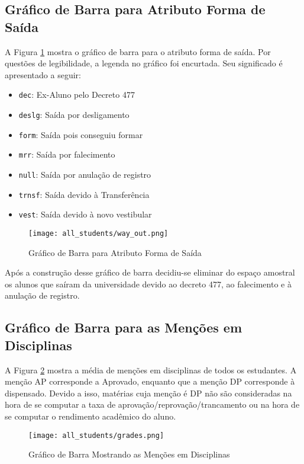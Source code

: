 \subsection{Gráfico de Barra para Atributo Forma de Saída}
A Figura \ref{atr_way_out} mostra o gráfico de barra para o atributo forma de saída. 
Por questões de legibilidade, a legenda no gráfico foi encurtada. Seu significado é
apresentado a seguir: 
\begin{itemize}
    \item \texttt{dec}: Ex-Aluno pelo Decreto 477
    \item \texttt{deslg}: Saída por desligamento
    \item \texttt{form}: Saída pois conseguiu formar
    \item \texttt{mrr}: Saída por falecimento
    \item \texttt{null}: Saída por anulação de registro
    \item \texttt{trnsf}: Saída devido à Transferência
    \item \texttt{vest}: Saída devido à novo vestibular
\end{itemize}

\begin{figure}[!ht]
    \caption{Gráfico de Barra para Atributo Forma de Saída}
    \centering
    \texttt{[image: all\_students/way\_out.png]}
    \label{atr_way_out}
\end{figure}

Após a construção desse gráfico de barra decidiu-se eliminar do espaço amostral os
alunos que saíram da universidade devido ao decreto 477, ao falecimento e à anulação
de registro. 

\subsection{Gráfico de Barra para as Menções em Disciplinas}
A Figura \ref{avg_grades} mostra a média de menções em disciplinas de todos os
estudantes. A menção AP corresponde a Aprovado, enquanto que a menção DP corresponde
à dispensado. Devido a isso, matérias cuja menção é DP não são consideradas na hora
de se computar a taxa de aprovação/reprovação/trancamento ou na hora de se computar o
rendimento acadêmico do aluno. 

\begin{figure}[!ht]
    \caption{Gráfico de Barra Mostrando as Menções em Disciplinas}
    \centering
    \texttt{[image: all\_students/grades.png]}
    \label{avg_grades}
\end{figure}
\clearpage


